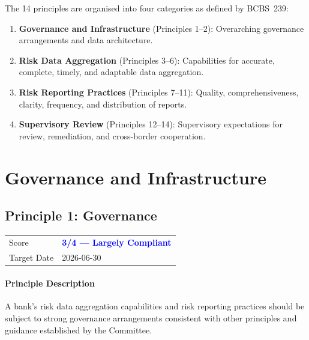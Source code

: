 \documentclass[11pt]{article}
\begin{document}
The 14 principles are organised into four categories as defined by BCBS~239:

\begin{enumerate}
    \item \textbf{Governance and Infrastructure} (Principles 1--2): Overarching
          governance arrangements and data architecture.
    \item \textbf{Risk Data Aggregation} (Principles 3--6): Capabilities for
          accurate, complete, timely, and adaptable data aggregation.
    \item \textbf{Risk Reporting Practices} (Principles 7--11): Quality,
          comprehensiveness, clarity, frequency, and distribution of reports.
    \item \textbf{Supervisory Review} (Principles 12--14): Supervisory
          expectations for review, remediation, and cross-border cooperation.
\end{enumerate}

\clearpage

\section{Governance and Infrastructure}

\subsection{Principle 1: Governance}

\begin{table}[H]
    \centering
    \begin{tabular}{ll}
        \toprule
        Score & \textcolor{blue}{\textbf{3/4 --- Largely Compliant}} \\
        Target Date & 2026-06-30 \\
        \bottomrule
    \end{tabular}
\end{table}

\paragraph{Principle Description}
A bank's risk data aggregation capabilities and risk reporting practices should be subject to strong governance arrangements consistent with other principles and guidance established by the Committee.
\end{document}
